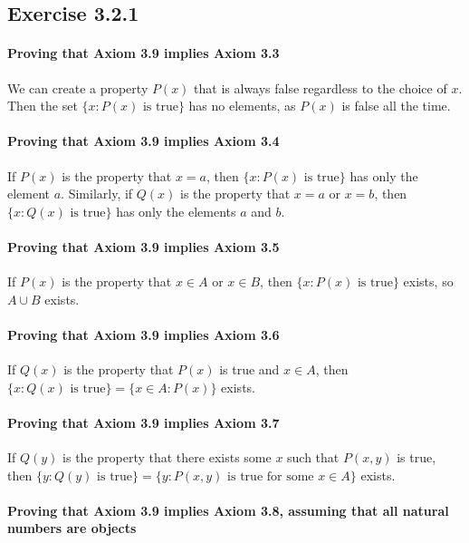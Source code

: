 \documentclass[12pt, oneside]{book}
\begin{document}
	\subsection*{Exercise 3.2.1}

	\paragraph*{Proving that Axiom 3.9 implies Axiom 3.3}

	We can create a property $P(x)$ that is always false regardless to the choice of $x$. Then the set $\{x: P(x) \text{ is true}\}$ has no elements, as $P(x)$ is false all the time.

	\paragraph*{Proving that Axiom 3.9 implies Axiom 3.4}

	If $P(x)$ is the property that $x = a$, then $\{x: P(x) \text{ is true}\}$ has only the element $a$. Similarly, if $Q(x)$ is the property that $x = a$ or $x = b$, then $\{x: Q(x) \text{ is true}\}$ has only the elements $a$ and $b$.

	\paragraph*{Proving that Axiom 3.9 implies Axiom 3.5}

	If $P(x)$ is the property that $x \in A$ or $x \in B$, then $\{x: P(x) \text{ is true}\}$ exists, so $A \cup B$ exists.

	\paragraph*{Proving that Axiom 3.9 implies Axiom 3.6}

	If $Q(x)$ is the property that $P(x)$ is true and $x \in A$, then $\{x: Q(x) \text{ is true}\} = \{x \in A: P(x)\}$ exists.

	\paragraph*{Proving that Axiom 3.9 implies Axiom 3.7}

	If $Q(y)$ is the property that there exists some $x$ such that $P(x, y)$ is true, then $\{y: Q(y) \text{ is true}\} = \{y: P(x, y) \text{ is true for some } x \in A\}$ exists.

	\paragraph*{Proving that Axiom 3.9 implies Axiom 3.8, assuming that all natural numbers are objects}
\end{document}
